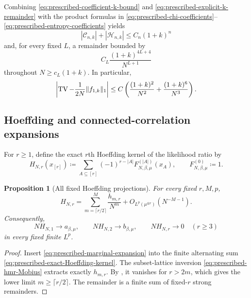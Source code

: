 \documentclass[11pt,reqno]{amsart}
\numberwithin{equation}{section}
\theoremstyle{plain}
\newtheorem{prop}[prop]{Proposition}
\theoremstyle{definition}
\DeclarePairedDelimiter{\norm}{\lVert}{\rVert}
\newcommand{\TV}{\operatorname{TV}}
\newcommand{\be}{\beta}
\begin{document}
Combining \eqref{eq:prescribed-coefficient-k-bound} and \eqref{eq:prescribed-explicit-k-remainder} with the product formulas in \eqref{eq:prescribed-chi-coefficients}--\eqref{eq:prescribed-entropy-coefficients} yields
\begin{equation}
 |\mathcal C_{n,k}|+|\mathcal H_{n,k}|
 \leq C_n(1+k)^n
 \label{eq:prescribed-divergence-coefficient-k-bound}
\end{equation}
and, for every fixed $L$, a remainder bounded by
\begin{equation}
 C_L\frac{(1+k)^{4L+4}}{N^{L+1}}
 \label{eq:prescribed-divergence-k-remainder}
\end{equation}
throughout $N\geq c_L(1+k)$.  In particular,
\begin{equation}
 \left|\TV-\frac1{2N}\norm{f_{1,k}}_1\right|
 \leq C\left(\frac{(1+k)^2}{N^2}
 +\frac{(1+k)^6}{N^3}\right).
 \label{eq:prescribed-TV-explicit-error}
\end{equation}

\subsection{Hoeffding and connected-correlation expansions}
\label{subsec:prescribed-hoeffding-clusters}

For $r\geq1$, define the exact $r$th Hoeffding kernel of the likelihood ratio by
\begin{equation}
 H_{N,r}(x_{[r]})
 \coloneqq\sum_{A\subseteq[r]}(-1)^{r-|A|}
 F_{N,\be,\mu}^{(|A|)}(x_A),
 \qquad F_{N,\be,\mu}^{(0)}\coloneqq1.
 \label{eq:prescribed-exact-Hoeffding-kernel}
\end{equation}

\begin{prop}[All fixed Hoeffding projections]
\label{prop:prescribed-Hoeffding-expansion}
For every fixed $r,M,p$,
\begin{equation}
 H_{N,r}
 =\sum_{m=\lceil r/2\rceil}^{M}\frac{h_{m,r}}{N^m}
 +O_{L^p(\mu^{\otimes r})}(N^{-M-1}).
 \label{eq:prescribed-Hoeffding-expansion}
\end{equation}
Consequently,
\begin{equation}
 NH_{N,1}\longrightarrow a_{\be,\mu},
 \qquad
 NH_{N,2}\longrightarrow b_{\be,\mu},
 \qquad
 NH_{N,r}\longrightarrow0\quad(r\geq3)
 \label{eq:prescribed-first-Hoeffding-limits}
\end{equation}
in every fixed finite $L^p$.
\end{prop}

\begin{proof}
Insert \eqref{eq:prescribed-marginal-expansion} into the finite alternating sum \eqref{eq:prescribed-exact-Hoeffding-kernel}.  The subset-lattice inversion \eqref{eq:prescribed-hmr-Mobius} extracts exactly $h_{m,r}$.  By , it vanishes for $r>2m$, which gives the lower limit $m\geq\lceil r/2\rceil$.  The remainder is a finite sum of fixed-$r$ strong remainders.
\end{proof}
\end{document}
